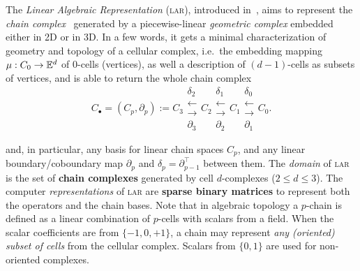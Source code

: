 The \emph{Linear Algebraic Representation} (\textsc{lar}), introduced in~\cite{Dicarlo:2014:TNL:2543138.2543294}, aims to represent the \emph{chain complex}~\cite{TSAS} generated by a piecewise-linear \emph{geometric complex} embedded either in 2D or in 3D. In a few words, it gets a minimal characterization of geometry and topology of a cellular complex, i.e.~the embedding mapping $\mu : C_0 \to \mathbb{E}^d$ of 0-cells (vertices), as well a description of $(d-1)$-cells as subsets of vertices, and is able to return the whole chain complex 
\begin{equation}
C_\bullet = (C_p, \partial_p) := 
C_3 
\substack{
\delta_2 \\
\longleftarrow \\
\longrightarrow \\
\partial_3 
}
C_2 
\substack{
\delta_1 \\
\longleftarrow \\
\longrightarrow \\
\partial_2 
}
C_1  
\substack{
\delta_0 \\
\longleftarrow  \\
\longrightarrow \\
\partial_1 
}
C_0 .
\end{equation}






\noindent
and, in particular, any basis for linear chain spaces $C_p$, and any linear
boundary/coboundary map \(\partial_p\) and
\(\delta_p=\partial_{p-1}^\top\) between them. The \emph{domain} of \textsc{lar} is the set of \textbf{chain complexes} generated by cell $d$-complexes ($2\leq d\leq 3$). The computer \emph{representations} of \textsc{lar} are \textbf{sparse binary matrices} to represent both the operators and the chain bases. Note that in algebraic topology a $p$-chain is defined as a linear combination of $p$-cells with scalars from a field. When the scalar coefficients are from $\{-1, 0, +1\}$, a chain may represent \emph{any (oriented) subset of cells} from the cellular complex.
Scalars from $\{0, 1\}$ are used for non-oriented complexes.

